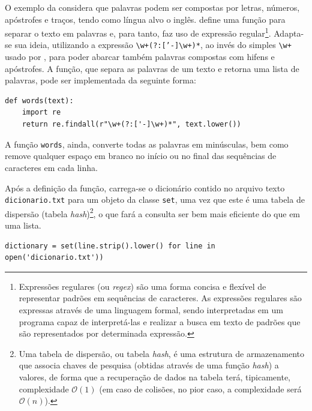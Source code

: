 \documentclass{textolivre}
\begin{document}
O exemplo da 
considera
que palavras podem ser compostas por letras, números, apóstrofes e traços,
tendo como língua alvo o inglês. 
\textcite{norvig2007} define uma função para separar o texto em palavras e, para tanto, faz 
uso de expressão regular\footnote{Expressões regulares (ou \textit{regex})
são uma forma concisa e flexível de representar padrões em sequências de caracteres.
As expressões regulares são expressas através de uma linguagem formal, sendo interpretadas em
um programa capaz de interpretá-las e realizar a busca em texto de padrões que são representados
por determinada expressão.}.
Adapta-se sua ideia, utilizando a expressão \texttt{\textbackslash w+(?:['-]\textbackslash w+)*}, 
ao invés do simples \texttt{\textbackslash w+} usado por
\textcite{norvig2007}, para poder abarcar também palavras compostas com hifens e apóstrofes.
A função, que separa as palavras de um
texto e retorna uma lista de palavras,
pode ser implementada da seguinte forma:
\begin{lstlisting}[label=lst-word-spellpy]
def words(text):
    import re
    return re.findall(r"\w+(?:['-]\w+)*", text.lower())
\end{lstlisting}%
A função \texttt{words}, ainda, converte
todas as 
palavras em minúsculas, bem como remove qualquer espaço em branco no
início ou no final das sequências de
caracteres em cada linha.

Após a definição da função, 
carrega-se o dicionário
contido no arquivo texto \texttt{dicionario.txt} para um objeto da classe \texttt{set}, 
uma vez que este é uma tabela de dispersão (tabela \textit{hash})\footnote{Uma tabela de dispersão, ou tabela \textit{hash}, é uma estrutura de armazenamento que associa chaves de pesquisa (obtidas através de uma função \textit{hash}) a valores, de forma que a recuperação de dados na tabela terá, tipicamente, complexidade $\mathcal{O}(1)$ (em caso de colisões, no pior caso, a complexidade será $\mathcal{O}(n)$).}, o que fará a consulta ser bem mais
eficiente do que em uma lista. 
\begin{lstlisting}[label=lst-dict-spellpy]
dictionary = set(line.strip().lower() for line in open('dicionario.txt'))
\end{lstlisting}%
\end{document}
